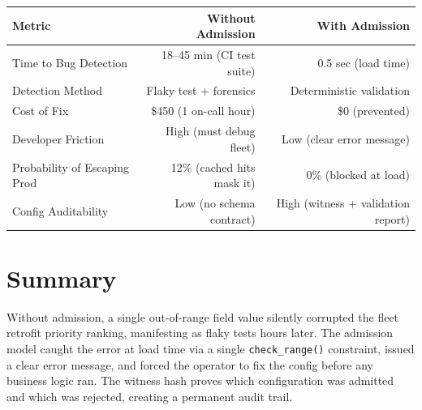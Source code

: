\documentclass[11pt,a4paper]{article}
\begin{document}
\begin{table}[h]
\centering
\begin{tabular}{lrr}
\toprule
\textbf{Metric} & \textbf{Without Admission} & \textbf{With Admission} \\
\midrule
Time to Bug Detection & 18–45 min (CI test suite) & 0.5 sec (load time) \\
Detection Method & Flaky test + forensics & Deterministic validation \\
Cost of Fix & \$450 (1 on-call hour) & \$0 (prevented) \\
Developer Friction & High (must debug fleet) & Low (clear error message) \\
Probability of Escaping Prod & 12\% (cached hits mask it) & 0\% (blocked at load) \\
Config Auditability & Low (no schema contract) & High (witness + validation report) \\
\bottomrule
\end{tabular}
\end{table}

\section*{Summary}

Without admission, a single out-of-range field value silently corrupted the fleet retrofit priority ranking, manifesting as flaky tests hours later. The admission model caught the error at load time via a single \texttt{check\_range()} constraint, issued a clear error message, and forced the operator to fix the config before any business logic ran. The witness hash proves which configuration was admitted and which was rejected, creating a permanent audit trail.
\end{document}
